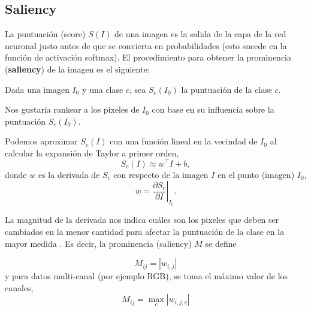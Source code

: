 \pagebreak
    
\subsection{Saliency}
La puntuación (score) $S(I)$ de una imagen es la salida de la capa de la red neuronal justo antes de que se convierta en probabilidades (esto sucede en la función de activación softmax). El procedimiento para obtener la prominencia (\textbf{saliency}) de la imagen es el siguiente:

\noindent
Dada una imagen $I_0$ y una clase $c$, sea $S_c(I_0)$ la puntuación de la clase $c$. 

\noindent
Nos gustaría rankear a los pixeles de $I_0$ con base en su influencia sobre la puntuación $S_c(I_0)$.

\noindent
Podemos aproximar $S_c(I)$ con una función lineal en la vecindad de $I_0$ al calcular la expansión de Taylor a primer orden,
\[S_c(I) \approx w^\top I + b,\]
donde $w$ es la derivada de $S_c$ con respecto de la imagen $I$ en el punto (imagen) $I_0$,
\[w = \left. \frac{\partial S_c}{\partial I} \right |_{I_0}.\]

\noindent
La magnitud de la derivada nos indica cuáles son los pixeles que deben ser cambiados en la menor cantidad para afectar la puntuación de la clase en la mayor medida \cite{simonyan2014deep}. Es decir, la prominencia (saliency) $M$ se define

\[M_{ij} = | w_{i,j}|\]
y para datos multi-canal (por ejemplo RGB), se toma el máximo valor de los canales,
\[M_{ij} = \max_c{|w_{i,j,c}|}\]


